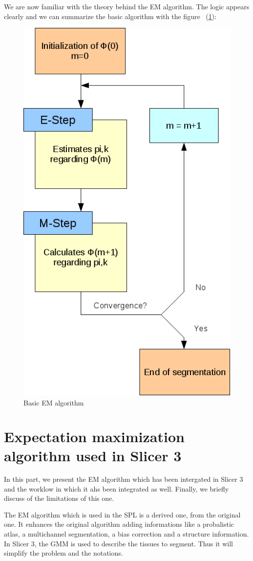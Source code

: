  
  \par
  We are now familiar with the theory behind the EM algorithm. The logic appears clearly and we can summarize the basic algorithm with the figure ~(\ref{fig:EMAlgorithm}):
   
  \begin{figure}[ht]\centering
  \includegraphics[width=.6\textwidth]{Images/Graphics/EMSimple.png}
  \caption{Basic EM algorithm}\label{fig:EMAlgorithm}
  \end{figure}

\section{Expectation maximization algorithm used in Slicer 3}\label{angels}
In this part, we present the EM algorithm which has been intergated in Slicer 3 and the worklow in which it ahs been integrated as well. Finally, we briefly discuss of the limitations of this one.
\par
The EM algorithm which is used in the SPL is a derived one, from the original one. It enhances the original algorithm adding informations like a probalistic atlas, a multichannel segmentation, a bias correction and a structure information. In Slicer 3, the GMM is used to describe the tissues to segment. Thus it will simplify the problem and the notations.
%
